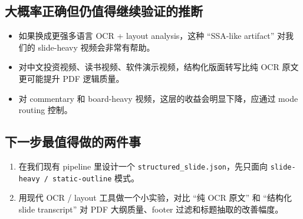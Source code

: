 \documentclass[a4paper]{article}
\begin{document}
\subsection{大概率正确但仍值得继续验证的推断}

\begin{itemize}
\item 如果换成更强多语言 OCR + layout analysis，这种 “SSA-like artifact” 对我们的 slide-heavy 视频会非常有帮助。
\item 对中文投资视频、读书视频、软件演示视频，结构化版面转写比纯 OCR 原文更可能提升 PDF 逻辑质量。
\item 对 commentary 和 board-heavy 视频，这层的收益会明显下降，应通过 mode routing 控制。
\end{itemize}

\subsection{下一步最值得做的两件事}

\begin{enumerate}
\item 在我们现有 pipeline 里设计一个 \texttt{structured\_slide.json}，先只面向 \texttt{slide-heavy / static-outline} 模式。
\item 用现代 OCR / layout 工具做一个小实验，对比 “纯 OCR 原文” 和 “结构化 slide transcript” 对 PDF 大纲质量、footer 过滤和标题抽取的改善幅度。
\end{enumerate}

\appendix
\end{document}
